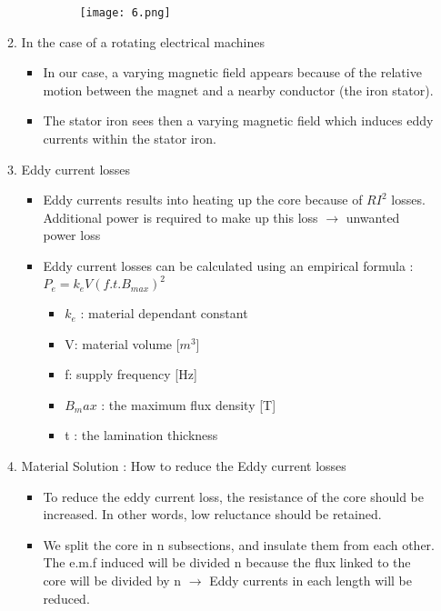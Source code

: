 \begin{enumerate}
\begin{enumerate}
\begin{itemize}
            \begin{figure}[H]
                \centering
                \texttt{[image: 6.png]}
                \caption{}
            \end{figure}
        \end{itemize}
        \item In the case of a rotating electrical machines 
        \begin{itemize}
            \item In our case, a varying magnetic field appears because of the relative motion between the magnet and a nearby conductor (the iron stator).
            \item The stator iron sees then a varying magnetic field which induces eddy currents within the stator iron.
        \end{itemize}
        \item Eddy current losses
        \begin{itemize}
            \item 	Eddy currents results into heating up the core because of $RI^2$ losses. Additional power is required to make up this loss $\rightarrow$ unwanted power loss
	        \item Eddy current losses can be calculated using an empirical formula :  $P_e=k_e V (f .t .B_{max}  )^2$
	        \begin{itemize}
	            \item $k_e$ : material dependant constant
	            \item V: material volume [$m^3$]
	            \item f: supply frequency [Hz]
	            \item $B_max$ : the maximum flux density [T]
	            \item t : the lamination thickness
	        \end{itemize}
        \end{itemize}
        \item Material Solution : How to reduce the Eddy current losses
        \begin{itemize}
            \item 	To reduce the eddy current loss, the resistance of the core should be increased. In other words, low reluctance should be retained.

            \item 	We split the core in n subsections, and insulate them from each other. The e.m.f induced will be divided n because the flux linked to the core will be divided by n $\rightarrow$ Eddy currents in each length will be reduced. 


\end{itemize}
\end{enumerate}
\end{enumerate}
